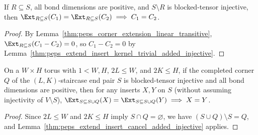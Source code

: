 \begin{lemma}
    \label{thm:peps_extend_insert_cancel_added_injective}
    \leanok
    If $R\subseteq S$, all bond dimensions are positive, and $S\setminus R$ is
    blocked-tensor injective, then
    $\Ext_{R\subseteq S}(C_1)=\Ext_{R\subseteq S}(C_2)\implies C_1=C_2$.
\end{lemma}
\begin{proof}\leanok
    By Lemma~\ref{thm:peps_corner_extension_linear_transitive},
    $\Ext_{R\subseteq S}(C_1-C_2)=0$, so $C_1-C_2=0$ by
    Lemma~\ref{thm:peps_extend_insert_kernel_trivial_added_injective}.
\end{proof}

\begin{lemma}
    \label{thm:peps_staircase_pair_cancel}
    \leanok
    On a $W\times H$ torus with $1<W,H$, $2L\le W$, and $2K\le H$, if the
    completed corner $Q$ of the $(L,K)$-staircase end pair $S$ is blocked-tensor
    injective and all bond dimensions are positive, then for any inserts $X,Y$
    on $S$ (without assuming injectivity of $V\setminus S$),
    $\Ext_{S\subseteq S\cup Q}(X)=\Ext_{S\subseteq S\cup Q}(Y)\implies X=Y$.
\end{lemma}
\begin{proof}\leanok
    Since $2L\le W$ and $2K\le H$ imply $S\cap Q=\varnothing$, we have
    $(S\cup Q)\setminus S=Q$, and
    Lemma~\ref{thm:peps_extend_insert_cancel_added_injective} applies.
\end{proof}
